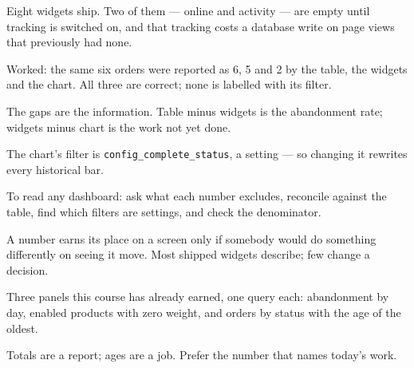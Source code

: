 \begin{chaptersummary}
\begin{tight}
  \item Eight widgets ship. Two of them --- online and activity --- are empty
        until tracking is switched on, and that tracking costs a database write
        on page views that previously had none.
  \item Worked: the same six orders were reported as 6, 5 and 2 by the table,
        the widgets and the chart. All three are correct; none is labelled with
        its filter.
  \item The gaps are the information. Table minus widgets is the abandonment
        rate; widgets minus chart is the work not yet done.
  \item The chart's filter is \texttt{config\_complete\_status}, a setting ---
        so changing it rewrites every historical bar.
  \item To read any dashboard: ask what each number excludes, reconcile against
        the table, find which filters are settings, and check the denominator.
  \item A number earns its place on a screen only if somebody would do
        something differently on seeing it move. Most shipped widgets describe;
        few change a decision.
  \item Three panels this course has already earned, one query each:
        abandonment by day, enabled products with zero weight, and orders by
        status with the age of the oldest.
  \item Totals are a report; ages are a job. Prefer the number that names
        today's work.
\end{tight}
\end{chaptersummary}

